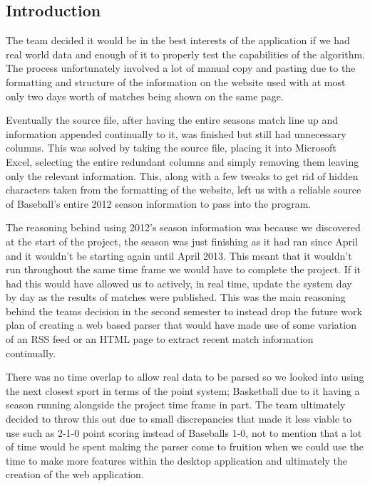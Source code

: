 \subsection{Introduction}

The team decided it would be in the best interests of the application if we had
real world data and enough of it to properly test the capabilities of the
algorithm. The process unfortunately involved a lot of manual copy and pasting
due to the formatting and structure of the information on the website used with
at most only two days worth of matches being shown on the same page.

Eventually the source file, after having the entire seasons match line up and
information appended continually to it, was finished but still had unnecessary
columns. This was solved by taking the source file, placing it into Microsoft
Excel, selecting the entire redundant columns and simply removing them leaving
only the relevant information. This, along with a few tweaks to get rid of
hidden characters taken from the formatting of the website, left us with a
reliable source of Baseball's entire 2012 season information to pass into the
program.

The reasoning behind using 2012's season information was because we discovered
at the start of the project, the season was just finishing as it had ran since
April and it wouldn't be starting again until April 2013. This meant that it
wouldn't run throughout the same time frame we would have to complete the
project. If it had this would have allowed us to actively, in real time, update
the system day by day as the results of matches were published. This was the
main reasoning behind the teams decision in the second semester to instead drop
the future work plan of creating a web based parser that would have made use of
some variation of an RSS feed or an HTML page to extract recent match
information continually.

There was no time overlap to allow real data to be parsed so we looked into
using the next closest sport in terms of the point system; Basketball due to it
having a season running alongside the project time frame in part. The team
ultimately decided to throw this out due to small discrepancies that made it
less viable to use such as 2-1-0 point scoring instead of Baseballs 1-0, not to
mention that a lot of time would be spent making the parser come to fruition
when we could use the time to make more features within the desktop application
and ultimately the creation of the web application.

